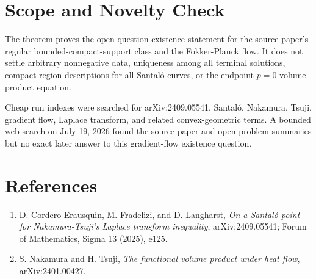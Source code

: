 \documentclass[11pt]{article}
\begin{document}
\section*{Scope and Novelty Check}

The theorem proves the open-question existence statement for the source
paper's regular bounded-compact-support class and the Fokker-Planck flow. It
does not settle arbitrary nonnegative data, uniqueness among all terminal
solutions, compact-region descriptions for all Santaló curves, or the endpoint
$p=0$ volume-product equation.

Cheap run indexes were searched for arXiv:2409.05541, Santaló, Nakamura,
Tsuji, gradient flow, Laplace transform, and related convex-geometric terms.
A bounded web search on July 19, 2026 found the source paper and open-problem
summaries but no exact later answer to this gradient-flow existence question.

\section*{References}

\begin{enumerate}
\item D. Cordero-Erausquin, M. Fradelizi, and D. Langharst,
\emph{On a Santaló point for Nakamura-Tsuji's Laplace transform inequality},
arXiv:2409.05541; Forum of Mathematics, Sigma 13 (2025), e125.
\item S. Nakamura and H. Tsuji,
\emph{The functional volume product under heat flow}, arXiv:2401.00427.
\end{enumerate}
\end{document}
